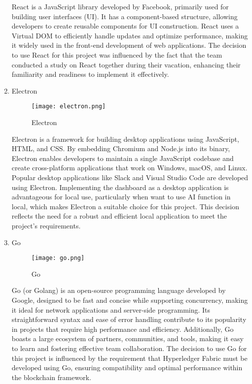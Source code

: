 \documentclass[conference]{IEEEtran}
\begin{document}
\begin{enumerate}[itemsep=2ex, parsep=1ex]
	      React is a JavaScript library developed by Facebook, primarily used for building
	      user interfaces (UI). It has a component-based structure, allowing developers
	      to create reusable components for UI construction. React uses a Virtual
	      DOM to efficiently handle updates and optimize performance, making it widely
	      used in the front-end development of web applications. The decision to use
	      React for this project was influenced by the fact that the team conducted
	      a study on React together during their vacation, enhancing their familiarity
	      and readiness to implement it effectively.
	      	      	      
	\item Electron
	      	      	      
	      \begin{figure}[h!]
	      	\centering
	      	\texttt{[image: electron.png]}
	      	\caption{Electron}
	      	\label{fig:Electron}
	      \end{figure}
	      	      	      
	      Electron is a framework for building desktop applications using JavaScript,
	      HTML, and CSS. By embedding Chromium and Node.js into its binary, Electron
	      enables developers to maintain a single JavaScript codebase and create
	      cross-platform applications that work on Windows, macOS, and Linux. Popular
	      desktop applications like Slack and Visual Studio Code are developed using
	      Electron. Implementing the dashboard as a desktop application is
	      advantageous for local use, particularly when want to use AI function in local,
	      which makes Electron a suitable choice for this project. This decision reflects
	      the need for a robust and efficient local application to meet the project’s
	      requirements.
	      	      
	      \vspace{5cm}
	      	      	      
	\item Go
	      	      	      
	      \begin{figure}[h!]
	      	\centering
	      	\texttt{[image: go.png]}
	      	\caption{Go}
	      	\label{fig:Go}
	      \end{figure}
	      	      	      
	      Go (or Golang) is an open-source programming language developed by Google,
	      designed to be fast and concise while supporting concurrency, making it
	      ideal for network applications and server-side programming. Its straightforward
	      syntax and ease of error handling contribute to its popularity in projects
	      that require high performance and efficiency. Additionally, Go boasts a large
	      ecosystem of partners, communities, and tools, making it easy to learn and
	      fostering effective team collaboration. The decision to use Go for this project
	      is influenced by the requirement that Hyperledger Fabric must be developed
	      using Go, ensuring compatibility and optimal performance within the
	      blockchain framework.
	      	      	      

\end{enumerate}
\end{document}
